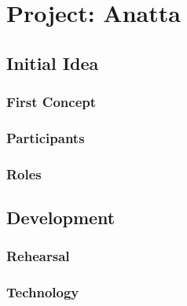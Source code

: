 
\chapter{Project: Anatta} %

\label{Chapter3} %

\section{Initial Idea}

\subsection{First Concept}

\subsection{Participants}

\subsection{Roles}

\section{Development}

\subsection{Rehearsal}

\subsection{Technology}

